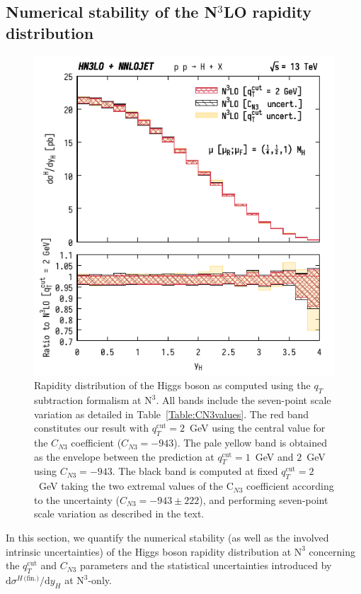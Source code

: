 \documentclass[12pt]{article}
\DeclareRobustCommand{\qt}{\ensuremath{q_T}\xspace}
\DeclareRobustCommand{\qtcut}{\ensuremath{q_T^\mathrm{cut}}\xspace}
\DeclareRobustCommand{\rd}{\ensuremath{\mathrm{d}}}
\DeclareRobustCommand{\fin}{\text{(fin.)}\xspace}
\DeclareRobustCommand{\LO}{\text{LO}\xspace}
\DeclareRobustCommand{\N}[1]{\ensuremath{\text{N}^{#1}}} %
\begin{document}
\subsection{Numerical stability of the \texorpdfstring{N${}^\text{3}$LO}{N3LO} rapidity distribution}
\label{sec:N3LOrap}

\begin{figure}[tbh]
\centering
\includegraphics[width=.6\linewidth]{./new_figures/yH_B02_only_N3LO_qTcut_uncert_CN3_uncert}
\caption{\label{fig:yHN3LOonly}{Rapidity distribution of the Higgs boson as computed using the $\qt$ subtraction formalism at \N3\LO. All bands include the seven-point scale variation as detailed in Table~\ref{Table:CN3values}. The red band constitutes our result with $\qtcut=2$~GeV using the central value for the $C_{N3}$ coefficient ($C_{N3}=-943$). The pale yellow band is obtained as the envelope between the prediction at $\qtcut=1$~GeV and $2$~GeV using $C_{N3}=-943$. The black band is computed at fixed $\qtcut=2$~GeV  taking the two extremal values of the C$_{N3}$ coefficient according to the uncertainty ($C_{N3}=-943 \pm 222$), and performing seven-point scale variation as described in the text.
}}
\end{figure}

In this section, we quantify the numerical stability (as well as the involved intrinsic uncertainties) of the Higgs boson rapidity distribution at \N3\LO concerning the $\qtcut$ and $C_{N3}$ parameters and the statistical uncertainties introduced by $\rd\sigma^{H\,\fin}/\rd y_H$ at \N3\LO-only.
\end{document}
